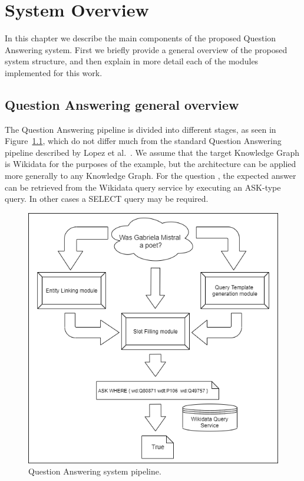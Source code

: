 \chapter{System Overview}
\label{cap3:system}
In this chapter we describe the main components of the proposed Question Answering system. 
First we briefly provide a general overview of the proposed system structure, and then explain 
in more detail each of the modules implemented for this work.

\section{Question Answering general overview}
\label{cap3:system/qaPipeline}
The Question Answering pipeline is divided into different stages, as seen in 
Figure~\ref{fig:questionAnsweringOverview}, which do not differ much from the standard 
Question Answering pipeline described by Lopez et al.~\cite{qa:core-techniques-DiefenbachLSM18}. 
We assume that the target Knowledge Graph is Wikidata for the purposes of the example, but 
the architecture can be applied more generally to any Knowledge Graph. For the question 
, the expected answer can be retrieved from the 
Wikidata query service by executing an ASK-type \SPARQL{} query. In other cases a SELECT query may be 
required.

\begin{figure}[!h]
    \centering
    \includegraphics[scale=.5]{imagenes/3_system_overview/QuestionAnsweringPipeline.png}
    \caption{Question Answering system pipeline.}
    \label{fig:questionAnsweringOverview}
\end{figure}

